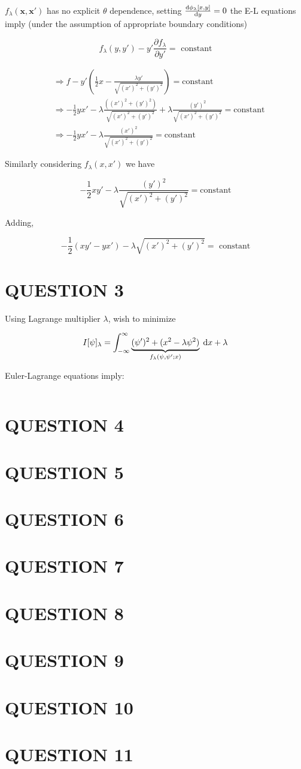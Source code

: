 \documentclass[a4paper]{article}
\begin{document}
$ f_{\lambda}(\mathbf{x},\mathbf{x}') $ has no explicit $ \theta $ dependence, setting $ \frac{\mathrm{d} \phi_{\lambda}[x,y]}{\mathrm{d} y} = 0 $ the E-L equations imply (under the assumption of appropriate boundary conditions)


\[ f_{\lambda}(y,y') - y' \frac{\partial f_{\lambda} }{\partial y'} = \text{ constant}  \]

\begin{align*}
& \Rightarrow f - y' \left(  \frac{1}{2} x - \frac{\lambda y'}{\sqrt{  (x')^{2}  + (y')^{2} }} \right) = \text{constant} \\
& \Rightarrow  -\frac{1}{2} yx' - \lambda \frac{ ( (x')^{2}  + (y')^{2} )}{\sqrt{  (x')^{2}  + (y')^{2} }} + \lambda \frac{(y')^{2}}{\sqrt{  (x')^{2}  + (y')^{2} }} = \text{constant} \\
& \Rightarrow - \frac{1}{2} y x' - \lambda \frac{(x')^{2}}{\sqrt{  (x')^{2}  + (y')^{2} }} = \text{constant}
\end{align*}

Similarly considering $ f_{\lambda}(x,x') $ we have

\[ - \frac{1}{2} x y' - \lambda \frac{(y')^{2}}{\sqrt{  (x')^{2}  + (y')^{2} }} = \text{constant} \]

Adding,

\[ -\frac{1}{2}(xy' - yx' ) - \lambda \sqrt{  (x')^{2}  + (y')^{2} } = \text{ constant} \]




\section{QUESTION 3}

Using Lagrange multiplier $ \lambda $, wish to minimize

\[ I[\psi]_{\lambda} = \int_{-\infty}^{\infty} \underbrace{(\psi')^{2} + (x^{2} - \lambda \psi^{2} )}_{f_{\lambda}(\psi,\psi' ; x)} \; \mathrm{d} x + \lambda   \]


Euler-Lagrange equations imply:

$  $





\section{QUESTION 4}
\section{QUESTION 5}
\section{QUESTION 6}
\section{QUESTION 7}
\section{QUESTION 8}
\section{QUESTION 9}
\section{QUESTION 10}
\section{QUESTION 11}
\end{document}
